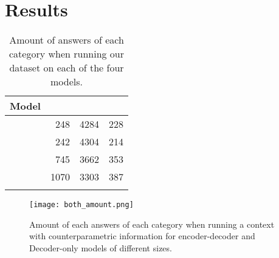 \section{Results}
\label{results_section}

\begin{table}[t]
	\caption{Amount of answers of each category when running our dataset on each of the four models.}
	\label{total_table}
	\centering
	\footnotesize
	\begin{tabular}{l r r r}
		\toprule
			\bfseries Model & \Pc{} & \Cc{} & \Oc{} \\
		\midrule
			\smallflan{}  & 248 & 4284 & 228 \\
			\bigflan{} & 242 & 4304 & 214 \\
		\midrule
			\smallllama{} & 745 & 3662 & 353 \\
			\bigllama{} & 1070 & 3303 & 387 \\
		\bottomrule \addlinespace[4pt]
	\end{tabular}
\end{table}

\begin{figure}[t]
	\centering
	\texttt{[image: both\_amount.png]}
	\caption{Amount of each answers of each category when running a context with counterparametric information for encoder-decoder and Decoder-only models of different sizes.}
	\label{total_plot}
\end{figure}

